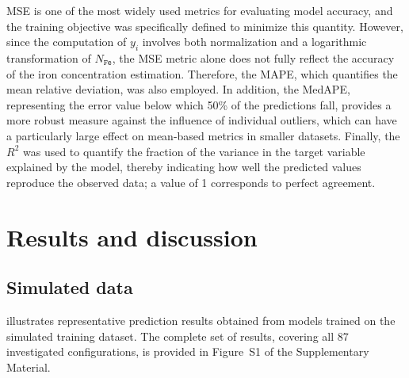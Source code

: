 \documentclass[10pt]{iopart}
\begin{document}
MSE is one of the most widely used metrics for evaluating model accuracy, 
and the training objective was specifically defined to minimize this quantity. 
However, since the computation of $y_i$ involves both normalization and a logarithmic transformation of $N_\mathtt{Fe}$,
the MSE metric alone does not fully reflect the accuracy of the iron concentration estimation. 
Therefore, the MAPE, which quantifies the mean relative deviation, was also employed. 
In addition, the MedAPE, representing the error value below which 50\% of the predictions fall, 
provides a more robust measure against the influence of individual outliers, 
which can have a particularly large effect on mean-based metrics in smaller datasets. 
Finally, the $R^2$ was used to quantify the fraction of the variance in the 
target variable explained by the model, 
thereby indicating how well the predicted values reproduce the observed data; 
a value of 1 corresponds to perfect agreement.


\section{Results and discussion}\label{sec:Rez}
\subsection{Simulated data}

 illustrates representative prediction results obtained from models trained on the simulated training dataset. 
The complete set of results, covering all 87 investigated configurations, is provided in Figure~S1 of the Supplementary Material.

\end{document}
